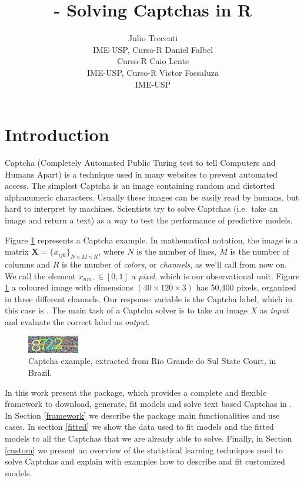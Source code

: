 \documentclass[article,nojss]{jss}
\author{
Julio Trecenti\\IME-USP, Curso-R \And Daniel Falbel\\Curso-R \And Caio Lente\\IME-USP, Curso-R \And Victor Fossaluza\\IME-USP
}
\title{\pkg{decryptr} - Solving Captchas in R}
\begin{document}
\hypertarget{introduction}{%
\section{Introduction}\label{introduction}}

Captcha (Completely Automated Public Turing test to tell Computers and
Humans Apart) is a technique used in many websites to prevent automated
access. The simplest Captcha is an image containing random and distorted
alphanumeric characters. Usually these images can be easily read by
humans, but hard to interpret by machines. Scientists try to solve
Captchas (i.e.~take an image and return a text) as a way to test the
performance of predictive models.

Figure \ref{fig:captcha-example} represents a Captcha example. In
mathematical notation, the image is a matrix
\(\mathbf X = \{x_{ijk}\}_{N\times M \times R}\), where \(N\) is the
number of lines, \(M\) is the number of columns and \(R\) is the number
of \emph{colors}, or \emph{channels}, as we'll call from now on. We call
the element \(x_{nm\cdot} \in [0,1]\) a \emph{pixel}, which is our
observational unit. Figure \ref{fig:captcha-example} a coloured image
with dimensions \((40\times120\times3)\) has 50,400 pixels, organized in
three different channels. Our response variable is the Captcha label,
which in this case is . The main task of a Captcha solver is
to take an image \(X\) as \emph{input} and evaluate the correct label as
\emph{output}.

\begin{CodeChunk}
\begin{figure}[H]

{\centering \includegraphics[width=0.2\textwidth]{captcha1d316e586b08} 

}

\caption[Captcha example, extracted from Rio Grande do Sul State Court, in Brazil]{Captcha example, extracted from Rio Grande do Sul State Court, in Brazil.}\label{fig:captcha-example}
\end{figure}
\end{CodeChunk}

In this work present the  package, which provides a
complete and flexible framework to download, generate, fit models and
solve text based Captchas in . In Section \ref{framework} we
describe the package main functionalities and use cases. In section
\ref{fitted} we show the data used to fit models and the fitted models
to all the Captchas that we are already able to solve. Finally, in
Section \ref{custom} we present an overview of the statistical learning
techniques used to solve Captchas and explain with examples how to
describe and fit customized models.
\end{document}
